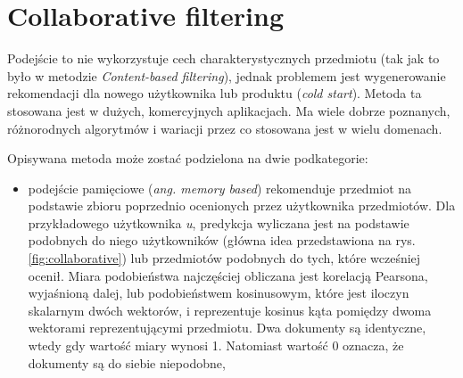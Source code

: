\section{Collaborative filtering}

Podejście to nie wykorzystuje cech charakterystycznych przedmiotu (tak jak to było w metodzie \textit{Content-based filtering}), jednak problemem jest wygenerowanie rekomendacji dla nowego użytkownika lub produktu (\textit{cold start}). Metoda ta stosowana jest w dużych, komercyjnych aplikacjach. Ma wiele dobrze poznanych, różnorodnych algorytmów i wariacji przez co stosowana jest w wielu domenach.

Opisywana metoda może zostać podzielona na dwie podkategorie:

\begin{itemize}
    \item podejście pamięciowe (\textit{ang. memory based}) rekomenduje przedmiot na podstawie zbioru poprzednio ocenionych przez użytkownika przedmiotów. Dla przykładowego użytkownika \textit{u}, predykcja wyliczana jest na podstawie podobnych do niego użytkowników (główna idea przedstawiona na rys. \ref{fig:collaborative}) lub przedmiotów podobnych do tych, które wcześniej ocenił. Miara podobieństwa najczęściej obliczana jest korelacją Pearsona, wyjaśnioną dalej, lub podobieństwem kosinusowym, które jest iloczyn skalarnym dwóch wektorów, i reprezentuje kosinus kąta pomiędzy dwoma wektorami reprezentującymi przedmiotu. Dwa dokumenty są identyczne, wtedy gdy wartość miary wynosi 1. Natomiast wartość 0 oznacza, że dokumenty są do siebie niepodobne,
    

\end{itemize}
